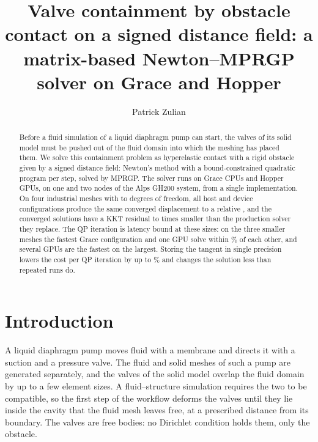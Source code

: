 \documentclass[sigconf,nonacm]{acmart}
\begin{document}
\title{Valve containment by obstacle contact on a signed distance field: a matrix-based
Newton--MPRGP solver on Grace and Hopper}

\author{Patrick Zulian}

\begin{abstract}
Before a fluid simulation of a liquid diaphragm pump can start, the valves of its solid model
must be pushed out of the fluid domain into which the meshing has placed them. We solve this
containment problem as hyperelastic contact with a rigid obstacle given by a signed distance
field: Newton's method with a bound-constrained quadratic program per step, solved by MPRGP. The
solver runs on Grace CPUs and Hopper GPUs, on one and two nodes of the Alps GH200 system, from a
single implementation. On four industrial meshes with \dofsMin{} to \dofsMax{} degrees of
freedom, all host and device configurations produce the same converged displacement to a
relative \agreeParallel{}, and the converged solutions have a KKT residual \kktRatioMin{} to
\kktRatioMax{} times smaller than the production solver they replace. The QP iteration is
latency bound at these sizes: on the three smaller meshes the fastest Grace configuration and one
GPU solve within \graceGpuCloseMax\% of each other, and several GPUs are the fastest on the
largest. Storing the tangent in single precision lowers the cost per QP
iteration by up to \singleMax\% and changes the solution less than repeated runs do.
\end{abstract}

\maketitle

\section{Introduction}

A liquid diaphragm pump moves fluid with a membrane and directs it with a suction and a pressure
valve. The fluid and solid meshes of such a pump are generated separately, and the valves of the
solid model overlap the fluid domain by up to a few element sizes. A fluid--structure simulation
requires the two to be compatible, so the first step of the workflow deforms the valves until
they lie inside the cavity that the fluid mesh leaves free, at a prescribed distance from its
boundary. The valves are free bodies: no Dirichlet condition holds them, only the obstacle.
\end{document}
